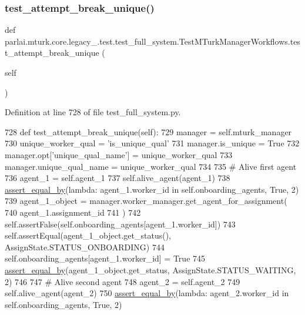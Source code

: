 \subsubsection{\texorpdfstring{test\+\_\+attempt\+\_\+break\+\_\+unique()}{test\_attempt\_break\_unique()}}
{\footnotesize\ttfamily def parlai.\+mturk.\+core.\+legacy\+\_.\+test.\+test\+\_\+full\+\_\+system.\+Test\+M\+Turk\+Manager\+Workflows.\+test\+\_\+attempt\+\_\+break\+\_\+unique (\begin{DoxyParamCaption}\item[{}]{self }\end{DoxyParamCaption})}



Definition at line 728 of file test\+\_\+full\+\_\+system.\+py.


\begin{DoxyCode}
728     \textcolor{keyword}{def }test\_attempt\_break\_unique(self):
729         manager = self.mturk\_manager
730         unique\_worker\_qual = \textcolor{stringliteral}{'is\_unique\_qual'}
731         manager.is\_unique = \textcolor{keyword}{True}
732         manager.opt[\textcolor{stringliteral}{'unique\_qual\_name'}] = unique\_worker\_qual
733         manager.unique\_qual\_name = unique\_worker\_qual
734 
735         \textcolor{comment}{# Alive first agent}
736         agent\_1 = self.agent\_1
737         self.alive\_agent(agent\_1)
738         \hyperlink{namespaceparlai_1_1mturk_1_1core_1_1test_1_1test__full__system_a0b463246d35658a2e422010f13dcf819}{assert\_equal\_by}(\textcolor{keyword}{lambda}: agent\_1.worker\_id \textcolor{keywordflow}{in} self.onboarding\_agents, \textcolor{keyword}{True}, 2)
739         agent\_1\_object = manager.worker\_manager.get\_agent\_for\_assignment(
740             agent\_1.assignment\_id
741         )
742         self.assertFalse(self.onboarding\_agents[agent\_1.worker\_id])
743         self.assertEqual(agent\_1\_object.get\_status(), AssignState.STATUS\_ONBOARDING)
744         self.onboarding\_agents[agent\_1.worker\_id] = \textcolor{keyword}{True}
745         \hyperlink{namespaceparlai_1_1mturk_1_1core_1_1test_1_1test__full__system_a0b463246d35658a2e422010f13dcf819}{assert\_equal\_by}(agent\_1\_object.get\_status, AssignState.STATUS\_WAITING, 2)
746 
747         \textcolor{comment}{# Alive second agent}
748         agent\_2 = self.agent\_2
749         self.alive\_agent(agent\_2)
750         \hyperlink{namespaceparlai_1_1mturk_1_1core_1_1test_1_1test__full__system_a0b463246d35658a2e422010f13dcf819}{assert\_equal\_by}(\textcolor{keyword}{lambda}: agent\_2.worker\_id \textcolor{keywordflow}{in} self.onboarding\_agents, \textcolor{keyword}{True}, 2)

\end{DoxyCode}
